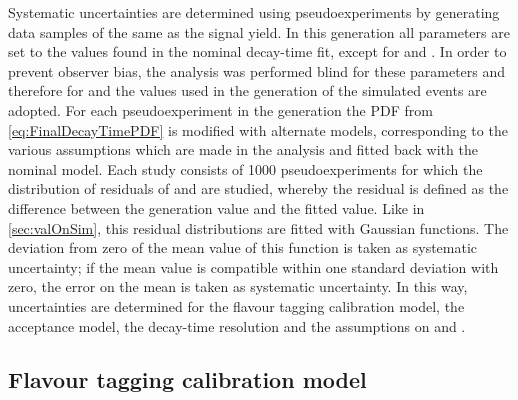 Systematic uncertainties are determined using pseudoexperiments by generating data samples of the same as the \BdToDpi signal yield.
In this generation all parameters are set to the values found in the nominal decay-time fit, except for \Sf and \Sfbar.
In order to prevent observer bias, the analysis was performed blind for these parameters and therefore for \Sf and \Sfbar the values used in the generation of the simulated events are adopted.
For each pseudoexperiment in the generation the PDF from \cref{eq:FinalDecayTimePDF} is modified with alternate models, corresponding to the various assumptions which are made in the analysis and fitted back with the nominal model.
Each study consists of \num{1000} pseudoexperiments for which the distribution of residuals of \Sf and \Sfbar are studied, whereby the residual is defined as the difference between the generation value and the fitted value.
Like in \cref{sec:valOnSim}, this residual distributions are fitted with Gaussian functions.
The deviation from zero of the mean value of this function is taken as systematic uncertainty; if the mean value is compatible within one standard deviation with zero, the error on the mean is taken as systematic uncertainty.
In this way, uncertainties are determined for the flavour tagging calibration model, the acceptance model, the decay-time resolution and the assumptions on \DG and \Cf.

\subsection*{Flavour tagging calibration model}


